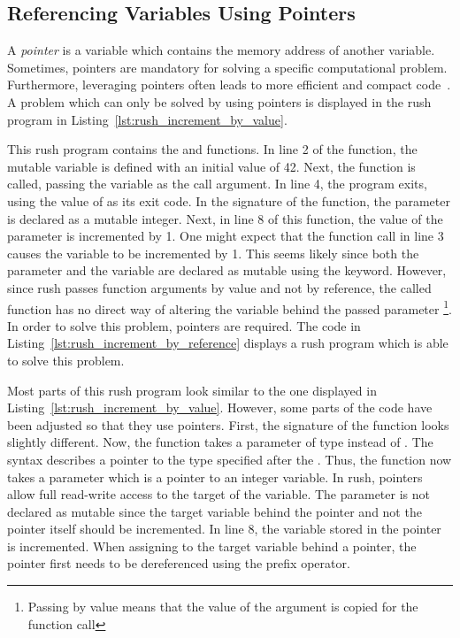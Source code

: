 \subsection{Referencing Variables Using Pointers}\label{sec:pointers}

A \emph{pointer} is a variable which contains the memory address of another variable.
Sometimes, pointers are mandatory for solving a specific computational problem.
Furthermore, leveraging pointers often leads to more efficient and compact code~\cite[p.~93]{Ritchie1988}.
A problem which can only be solved by using pointers is displayed in the rush program in Listing~\ref{lst:rush_increment_by_value}.


This rush program contains the  and  functions.
In line 2 of the  function, the mutable variable  is defined with an initial value of 42.
Next, the  function is called, passing the variable as the call argument.
In line 4, the program exits, using the value of  as its exit code.
In the signature of the  function, the  parameter is declared as a mutable integer.
Next, in line 8 of this function, the value of the parameter is incremented by 1.
One might expect that the function call in line 3 causes the variable  to be incremented by 1.
This seems likely since both the parameter and the variable are declared as mutable using the  keyword.
However, since rush passes function arguments by value and not by reference, the called function has no direct way of altering the variable behind the passed parameter
\footnote{Passing by value means that the value of the argument is copied for the function call}.
In order to solve this problem, pointers are required.
The code in Listing~\ref{lst:rush_increment_by_reference} displays a rush program which is able to solve this problem.


Most parts of this rush program look similar to the one displayed in Listing~\ref{lst:rush_increment_by_value}.
However, some parts of the code have been adjusted so that they use pointers.
First, the signature of the  function looks slightly different.
Now, the function takes a parameter of type  instead of .
The syntax  describes a pointer to the type specified after the \qVerb{*}.
Thus, the function now takes a parameter which is a pointer to an integer variable.
In rush, pointers allow full read-write access to the target of the variable.
The parameter is not declared as mutable since the target variable behind the pointer and not the pointer itself should be incremented.
In line 8, the variable stored in the pointer is incremented.
When assigning to the target variable behind a pointer, the pointer first needs to be dereferenced using the \qVerb{*} prefix operator.

